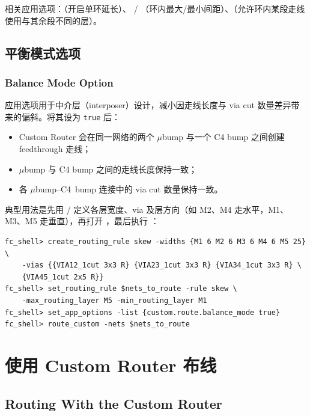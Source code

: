 相关应用选项：（开启单环延长）、 / （环内最大/最小间距）、（允许环内某段走线使用与其余段不同的层）。

\subsection{平衡模式选项}
\subsubsection*{Balance Mode Option}

 应用选项用于中介层（interposer）设计，减小因走线长度与 via cut 数量差异带来的偏斜。将其设为 \texttt{true} 后：
\begin{itemize}
  \item Custom Router 会在同一网络的两个 $\mu$bump 与一个 C4 bump 之间创建 feedthrough 走线；
  \item $\mu$bump 与 C4 bump 之间的走线长度保持一致；
  \item 各 $\mu$bump--C4~bump 连接中的 via cut 数量保持一致。
\end{itemize}

典型用法是先用 / 定义各层宽度、via 及层方向（如 M2、M4 走水平，M1、M3、M5 走垂直），再打开 ，最后执行 ：

\begin{lstlisting}
fc_shell> create_routing_rule skew -widths {M1 6 M2 6 M3 6 M4 6 M5 25} \
    -vias {{VIA12_1cut 3x3 R} {VIA23_1cut 3x3 R} {VIA34_1cut 3x3 R} \
    {VIA45_1cut 2x5 R}}
fc_shell> set_routing_rule $nets_to_route -rule skew \
    -max_routing_layer M5 -min_routing_layer M1
fc_shell> set_app_options -list {custom.route.balance_mode true}
fc_shell> route_custom -nets $nets_to_route
\end{lstlisting}

\section{使用 Custom Router 布线}
\subsection*{Routing With the Custom Router}

